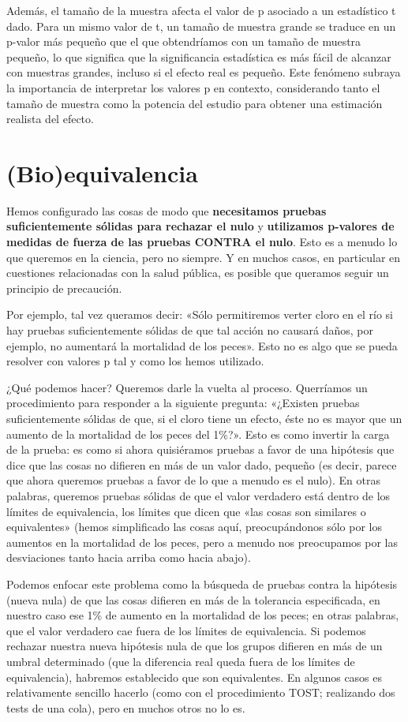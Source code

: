\documentclass{config/apuntes}\usepackage[]{graphicx}\usepackage[]{xcolor}
\begin{document}
Además, el tamaño de la muestra afecta el valor de p asociado a un estadístico t dado. Para un mismo valor de t, un tamaño de muestra grande se traduce en un p-valor más pequeño que el que obtendríamos con un tamaño de muestra pequeño, lo que significa que la significancia estadística es más fácil de alcanzar con muestras grandes, incluso si el efecto real es pequeño. Este fenómeno subraya la importancia de interpretar los valores p en contexto, considerando tanto el tamaño de muestra como la potencia del estudio para obtener una estimación realista del efecto.

\section{(Bio)equivalencia}
Hemos configurado las cosas de modo que \textbf{necesitamos pruebas suficientemente sólidas para rechazar el nulo} y \textbf{utilizamos p-valores de medidas de fuerza de las pruebas CONTRA el nulo}. Esto es a menudo lo que queremos en la ciencia, pero no siempre. Y en muchos casos, en particular en cuestiones relacionadas con la salud pública, es posible que queramos seguir un principio de precaución.

Por ejemplo, tal vez queramos decir: «Sólo permitiremos verter cloro en el río si hay pruebas suficientemente sólidas de que tal acción no causará daños, por ejemplo, no aumentará la mortalidad de los peces». Esto no es algo que se pueda resolver con valores p tal y como los hemos utilizado. 

¿Qué podemos hacer? Queremos darle la vuelta al proceso. Querríamos un procedimiento para responder a la siguiente pregunta: «¿Existen pruebas suficientemente sólidas de que, si el cloro tiene un efecto, éste no es mayor que un aumento de la mortalidad de los peces del 1\%?». Esto es como invertir la carga de la prueba: es como si ahora quisiéramos pruebas a favor de una hipótesis que dice que las cosas no difieren en más de un valor dado, pequeño (es decir, parece que ahora queremos pruebas a favor de lo que a menudo es el nulo). En otras palabras, queremos pruebas sólidas de que el valor verdadero está dentro de los límites de equivalencia, los límites que dicen que «las cosas son similares o equivalentes» (hemos simplificado las cosas aquí, preocupándonos sólo por los aumentos en la mortalidad de los peces, pero a menudo nos preocupamos por las desviaciones tanto hacia arriba como hacia abajo).

Podemos enfocar este problema como la búsqueda de pruebas contra la hipótesis (nueva nula) de que las cosas difieren en más de la tolerancia especificada, en nuestro caso ese 1\% de aumento en la mortalidad de los peces; en otras palabras, que el valor verdadero cae fuera de los límites de equivalencia. Si podemos rechazar nuestra nueva hipótesis nula de que los grupos difieren en más de un umbral determinado (que la diferencia real queda fuera de los límites de equivalencia), habremos establecido que son equivalentes. En algunos casos es relativamente sencillo hacerlo (como con el procedimiento TOST; realizando dos tests de una cola), pero en muchos otros no lo es.
\end{document}
